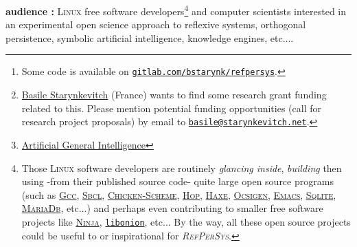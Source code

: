 \documentclass[11pt,a4paper,svgnames]{article}
\newcommand{\RefPerSys}{{\textit{\textsc{RefPerSys}}}}
\begin{document}
\begin{titlepage}
  \thispagestyle{empty}
  \maketitle

  \bigskip

  \begin{abstract}
    \textit{\textsc{RefPerSys}}
    is a \textsc{\textbf{Ref}}lexive and
    orthogonally \textsc{\textbf{Per}}sistent \textsc{\textbf{Sys}}tem
    (as a GPLv3+ licensed free software\footnote{Some code is
    available on
    \href{https://gitlab.com/bstarynk/refpersys}{\texttt{gitlab.com/bstarynk/refpersys}}.})
    running on Linux; it is a
    hobby\footnote{\href{http://starynkevitch.net/Basile/}{Basile
      Starynkevitch} (France) wants to find some research grant
    funding related to this. Please mention potential funding
    opportunities (call for research project proposals) by email to
    \href{mailto:basile@starynkevitch.net}{\texttt{basile@starynkevitch.net}}.} but serious \textbf{research project}
    for many years, mostly aimed to experiment \textbf{open science}
    ideas close to
    \gls{AGI}\footnote{{\href{https://en.wikipedia.org/wiki/Artificial\_general\_intelligence}{Artificial
        General Intelligence}}} dreams, and we don't expect useful or
    interesting results before several years of hard work.
  \end{abstract}

  \medskip

  \textbf{audience :} \textsc{Linux} free software
  developers\footnote{Those \textsc{Linux} software developers are
  routinely \emph{glancing inside}, \emph{building} then using -from
  their published source code- quite large open source programs (such
  as \href{http://gcc.gnu.org/}{\textsc{Gcc}},
  \href{http://sbcl.org/}{\textsc{Sbcl}},
  \href{https://www.call-cc.org/}{\textsc{Chicken-Scheme}},
  \href{http://hop.inria.fr/}{\textsc{Hop}},
  \href{https://haxe.org/}{\textsc{Haxe}},
  \href{https://ocsigen.org}{\textsc{Ocsigen}},
  \href{https://www.gnu.org/software/emacs/}{\textsc{Emacs}},
  \href{https://sqlite.org/}{\textsc{Sqlite}},
  \href{https://mariadb.org/}{\textsc{MariaDb}}, etc...)  and perhaps
  even contributing to smaller free software projects like
  \href{https://ninja-build.org/}{\textsc{Ninja}},
  \href{https://github.com/davidmoreno/onion}{\texttt{libonion}},
  etc... By the way, all these open source projects could be useful to
  or inspirational for \RefPerSys.} and computer scientists interested in
  an experimental open science approach to reflexive systems,
  orthogonal persistence, symbolic artificial intelligence, knowledge
  engines, etc....



\end{titlepage}
\end{document}
